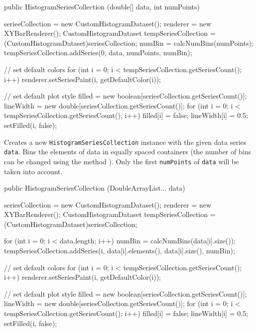 \begin{code}

   public HistogramSeriesCollection (double[] data, int numPoints) \begin{hide} {
      seriesCollection = new CustomHistogramDataset();
      renderer = new XYBarRenderer();
      CustomHistogramDataset tempSeriesCollection =
             (CustomHistogramDataset)seriesCollection;
      numBin = calcNumBins(numPoints);
      tempSeriesCollection.addSeries(0, data, numPoints, numBin);

      // set default colors
      for (int i = 0; i < tempSeriesCollection.getSeriesCount(); i++) {
         renderer.setSeriesPaint(i, getDefaultColor(i));
      }

      // set default plot style
      filled = new boolean[seriesCollection.getSeriesCount()];
      lineWidth = new double[seriesCollection.getSeriesCount()];
      for (int i = 0; i < tempSeriesCollection.getSeriesCount(); i++) {
         filled[i] = false;
         lineWidth[i] = 0.5;
         setFilled(i, false);
      }
   }\end{hide}
\end{code}
\begin{tabb}
   Creates a new \texttt{HistogramSeriesCollection} instance with the given data
   series \texttt{data}. Bins the elements of data in equally spaced containers
   (the number of bins can be changed using the method ).
   Only the first \texttt{numPoints} of \texttt{data} will be taken into account.
\end{tabb}
\begin{htmlonly}
\end{htmlonly}
\begin{code}

   public HistogramSeriesCollection (DoubleArrayList... data) \begin{hide} {
      seriesCollection = new CustomHistogramDataset();
      renderer = new XYBarRenderer();
      CustomHistogramDataset tempSeriesCollection =
          (CustomHistogramDataset)seriesCollection;

      for (int i = 0; i < data.length; i++) {
         numBin = calcNumBins(data[i].size());
         tempSeriesCollection.addSeries(i, data[i].elements(), data[i].size(), numBin);
      }

      // set default colors
      for (int i = 0; i < tempSeriesCollection.getSeriesCount(); i++) {
         renderer.setSeriesPaint(i, getDefaultColor(i));
      }

      // set default plot style
      filled = new boolean[seriesCollection.getSeriesCount()];
      lineWidth = new double[seriesCollection.getSeriesCount()];
      for (int i = 0; i < tempSeriesCollection.getSeriesCount(); i++) {
         filled[i] = false;
         lineWidth[i] = 0.5;
         setFilled(i, false);
      }
   }\end{hide}
\end{code}
